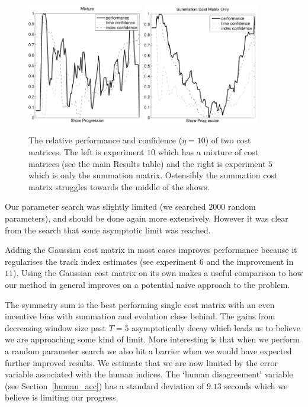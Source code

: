 \documentclass[twocolumn]{article}
\begin{document}
	\begin{figure}[t]
		\centering
		\includegraphics[width=0.45\textwidth]{images/confs_mix}
		\includegraphics[width=0.45\textwidth]{images/confs_sum}
		\caption{The relative performance and confidence ($\eta=10$) of two cost matrices. The left is experiment $10$ which has a mixture of cost matrices (see the main Results table) and the right is experiment $5$ which is only the summation matrix. Ostensibly the summation cost matrix struggles towards the middle of the shows.}
		\label{fig:overallconfs}
	\end{figure} 

Our parameter search was slightly limited (we searched $2000$ random parameters), and should be done again more extensively. However it was clear from the search that some asymptotic limit was reached. 

Adding the Gaussian cost matrix in most cases improves performance because it regularises the track index estimates (see experiment $6$ and the improvement in $11$). Using the Gaussian cost matrix on its own makes a useful comparison to how our method in general improves on a potential naive approach to the problem. 

The symmetry sum is the best performing single cost matrix with an even incentive bias with summation and evolution close behind. The gains from decreasing window size past $T=5$ asymptotically decay which leads us to believe we are approaching some kind of limit. More interesting is that when we perform a random parameter search we also hit a barrier when we would have expected further improved results. We estimate that we are now limited by the error variable associated with the human indices. The `human disagreement' variable (see Section~\ref{human_acc}) has a standard deviation of $9.13$ seconds which we believe is limiting our progress. 
\end{document}
